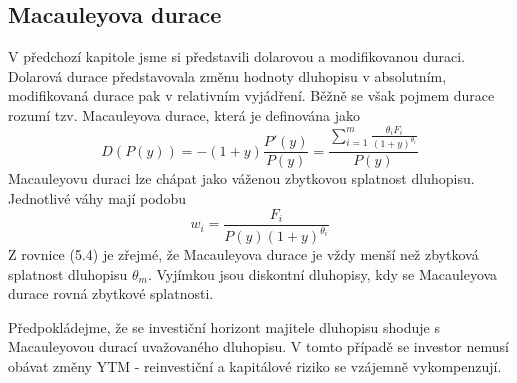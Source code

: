 \documentclass[a4paper]{book}
\begin{document}
\subsection{Macauleyova durace}

V předchozí kapitole jsme si představili dolarovou a modifikovanou duraci. Dolarová durace představovala změnu hodnoty dluhopisu v absolutním, modifikovaná durace pak v relativním vyjádření. Běžně se však pojmem durace rozumí tzv. Macauleyova durace, která je definována jako
\begin{equation}
D(P(y)) = -(1 + y)\frac{P'(y)}{P(y)} = \frac{\sum_{i = 1}^m \frac{\theta_i F_i}{(1 + y)^{\theta_i}}}{P(y)}
\end{equation}
Macauleyovu duraci lze chápat jako váženou zbytkovou splatnost dluhopisu. Jednotlivé váhy mají podobu
\begin{equation*}
w_i = \frac{F_i}{P(y)(1+y)^{\theta_i}}
\end{equation*}
Z rovnice (5.4) je zřejmé, že Macauleyova durace je vždy menší než zbytková splatnost dluhopisu $\theta_m$. Vyjímkou jsou diskontní dluhopisy, kdy se Macauleyova durace rovná zbytkové splatnosti.

Předpokládejme, že se investiční horizont majitele dluhopisu shoduje s Macauleyovou durací uvažovaného dluhopisu. V tomto případě se investor nemusí obávat změny YTM - reinvestiční a kapitálové riziko se vzájemně vykompenzují.\\
\end{document}
